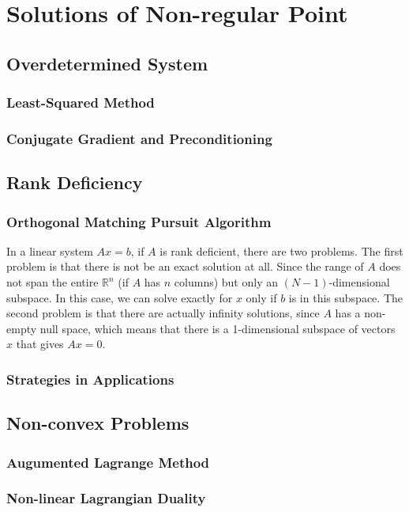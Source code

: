 \chapter{Solutions of Non-regular Point}
\label{cha:result}




\section{Overdetermined System}
\subsection{Least-Squared Method}


\subsection{Conjugate Gradient and Preconditioning}

\section{Rank Deficiency}
\subsection{Orthogonal Matching Pursuit Algorithm}
In a linear system $Ax=b$, if $A$ is rank deficient, there are two problems. The first problem is that there is not be an exact solution at all. Since the range of $A$ does not span the entire $\mathbb{R}^n$ (if $A$ has $n$ columns) but only an $(N-1)$-dimensional subspace. In this case, we can solve exactly for $x$ only if $b$ is in this subspace. The second problem is that there are actually infinity solutions, since $A$ has a non-empty null space, which means that there is a 1-dimensional subspace of vectors $x$ that gives $Ax=0$. 


\subsection{Strategies in Applications}

\section{Non-convex Problems}
\subsection{Augumented Lagrange Method}
\subsection{Non-linear Lagrangian Duality}


